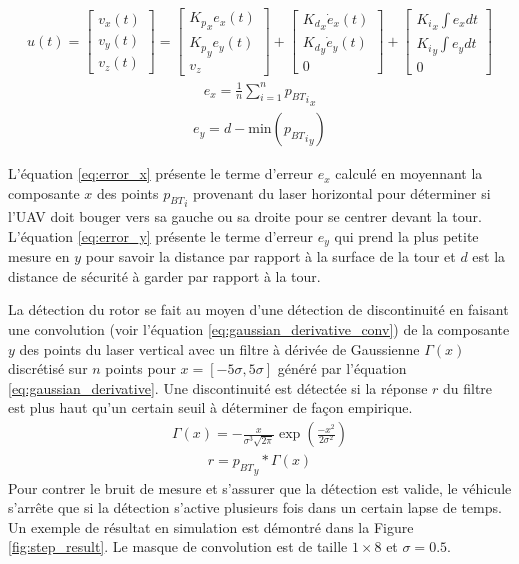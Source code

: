 \begin{align}
  u(t) = \begin{bmatrix}v_x(t)\\ v_y(t)\\ v_z(t)\end{bmatrix} =
  \begin{bmatrix}{K_p}_x e_x(t)\\ {K_p}_y e_y(t)\\ v_z\end{bmatrix} +
  \begin{bmatrix}{K_d}_x \dot{e}_x(t)\\ {K_d}_y \dot{e}_y(t)\\ 0\end{bmatrix} +
  \begin{bmatrix}{K_i}_x \int e_x dt\\ {K_i}_y \int e_y dt\\ 0\end{bmatrix}
  \label{eq:tower_pid}
\end{align}
\begin{align}
  e_x = \frac{1}{n} \sum_{i = 1}^n {{p_{BT}}_i}_x
  \label{eq:error_x}
\end{align}
\begin{align}
  e_y = d - {\text{min}}({{p_{BT}}_i}_y)
  \label{eq:error_y}
\end{align}

L'équation \ref{eq:error_x} présente le terme d'erreur $e_x$ calculé en moyennant la composante $x$ des points ${p_{BT}}_i$ provenant du laser horizontal pour déterminer si l'UAV doit bouger vers sa gauche ou sa droite pour se centrer devant la tour. L'équation \ref{eq:error_y} présente le terme d'erreur $e_y$ qui prend la plus petite mesure en $y$ pour savoir la distance par rapport à la surface de la tour et $d$ est la distance de sécurité à garder par rapport à la tour.

La détection du rotor se fait au moyen d'une détection de discontinuité en faisant une convolution (voir l'équation \ref{eq:gaussian_derivative_conv}) de la composante $y$ des points du laser vertical avec un filtre à dérivée de Gaussienne $\Gamma(x)$ discrétisé sur $n$ points pour $x=[-5\sigma,5\sigma]$ généré par l'équation \ref{eq:gaussian_derivative}. Une discontinuité est détectée si la réponse $r$ du filtre est plus haut qu'un certain seuil à déterminer de façon empirique.
\begin{align}
  \Gamma(x) = - \frac{x}{\sigma^3 \sqrt{2\pi}} \exp\left(\frac{-x^2}{2 \sigma^2}\right)
  \label{eq:gaussian_derivative}
\end{align}
\begin{align}
  r = {p_{BT}}_y * \Gamma(x)
  \label{eq:gaussian_derivative_conv}
\end{align}
Pour contrer le bruit de mesure et s'assurer que la détection est valide, le véhicule s'arrête que si la détection s'active plusieurs fois dans un certain lapse de temps. Un exemple de résultat en simulation est démontré dans la Figure \ref{fig:step_result}. Le masque de convolution est de taille $1\times8$ et $\sigma = 0.5$.

